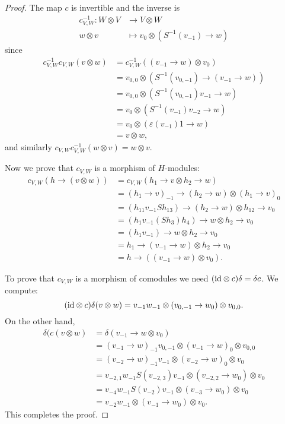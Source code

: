 \begin{proof}
The map $c$ is invertible and the inverse is 
\begin{align*}
c_{V,W}^{-1}:W\otimes V & \to V\otimes W\\
w\otimes v & \mapsto v_{0}\otimes(S^{-1}(v_{-1})\to w)
\end{align*}
since
\begin{align*}
c_{V,W}^{-1}c_{V,W}(v\otimes w) & =c_{V,W}^{-1}((v_{-1}\to w)\otimes v_{0})\\
 & =v_{0,0}\otimes(S^{-1}(v_{0,-1})\to(v_{-1}\to w))\\
 & =v_{0,0}\otimes(S^{-1}(v_{0,-1})v_{-1}\to w)\\
 & =v_{0}\otimes(S^{-1}(v_{-1})v_{-2}\to w)\\
 & =v_{0}\otimes(\varepsilon(v_{-1})1\to w)\\
 & =v\otimes w,
\end{align*}
and similarly $c_{V,W}c_{V,W}^{-1}(w\otimes v)=w\otimes v$. 

Now we prove that $c_{V,W}$ is a morphism of $H$-modules: 
\begin{align*}
c_{V,W}(h\rightarrow (v\otimes w))&=c_{V,W}(h_1\rightarrow v\otimes h_2\rightarrow w)\\
&=(h_1\rightarrow v)_{-1}\rightarrow(h_2\rightarrow w)\otimes(h_1\rightarrow v)_0\\
&=(h_{11}v_{-1}Sh_{13})\rightarrow(h_2\rightarrow w)\otimes h_{12}\rightarrow v_0\\
&=(h_1v_{-1}(Sh_3)h_4)\rightarrow w\otimes h_2\rightarrow v_0\\
&=(h_1v_{-1})\rightarrow w\otimes h_2\rightarrow v_0\\
&=h_1\rightarrow(v_{-1}\rightarrow w)\otimes h_2\rightarrow v_0\\
&=h\rightarrow((v_{-1}\rightarrow w)\otimes v_0).
\end{align*}

To prove that $c_{V,W}$ is a morphism of comodules we need $(\mathrm{id}\otimes
c)\delta=\delta c$.  We compute:
\[
(\mathrm{id}\otimes c)\delta(v\otimes w)=v_{-1}w_{-1}\otimes (v_{0,-1}\rightarrow w_0)\otimes v_{0,0}.
\]
On the other hand,
\begin{align*}
\delta(c(v\otimes w)&=\delta(v_{-1}\rightarrow w\otimes v_0)\\
&=(v_{-1}\rightarrow w)_{-1}v_{0,-1}\otimes(v_{-1}\rightarrow w)_0\otimes v_{0,0}\\
&=(v_{-2}\rightarrow w)_{-1}v_{-1}\otimes (v_{-2}\rightarrow w)_0\otimes v_0\\
&=v_{-2,1}w_{-1}S(v_{-2,3})v_{-1}\otimes(v_{-2,2}\rightarrow w_0)\otimes v_0\\
&=v_{-4}w_{-1}S(v_{-2})v_{-1}\otimes (v_{-3}\rightarrow w_0)\otimes v_0\\
&=v_{-2}w_{-1}\otimes(v_{-1}\rightarrow w_0)\otimes v_0.
\end{align*}
This completes the proof.
\end{proof}

